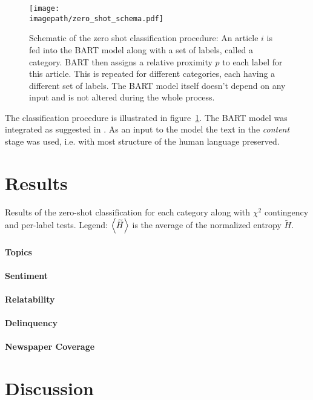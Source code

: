 \begin{figure}
    \centering
    \texttt{[image: \\imagepath/zero\_shot\_schema.pdf]}
    \caption{Schematic of the zero shot classification procedure: An article $i$ is fed into the BART model along with a set of labels, called a category. BART then assigns a relative proximity $p$ to each label for this article. This is repeated for different categories, each having a different set of labels. The BART model itself doesn't depend on any input and is not altered during the whole process.}\label{fig:zero_shot_schema}
\end{figure}

The classification procedure is illustrated in figure~\ref{fig:zero_shot_schema}. The BART model was integrated as suggested in \textcite{huggingfacebart-large-mnli_facebookbart-large-mnli_nodate}. As an input to the model the text in the \textit{content} stage was used, i.e. with most structure of the human language preserved.

\section{Results}\label{ch:supervised_results}
\begin{table}
    \centering
    \resizebox{0.88\textwidth}{!}{}
    \caption{Results of the zero-shot classification for each category along with $\chi^2$ contingency and per-label tests. Legend: $\Braket{\widetilde{H}}$ is the average of the normalized entropy $\widetilde{H}$.}\label{tab:zero_shot_result_table}
\end{table}
\paragraph{Topics}
\paragraph{Sentiment}
\paragraph{Relatability}
\paragraph{Delinquency}
\paragraph{Newspaper Coverage}

\section{Discussion}